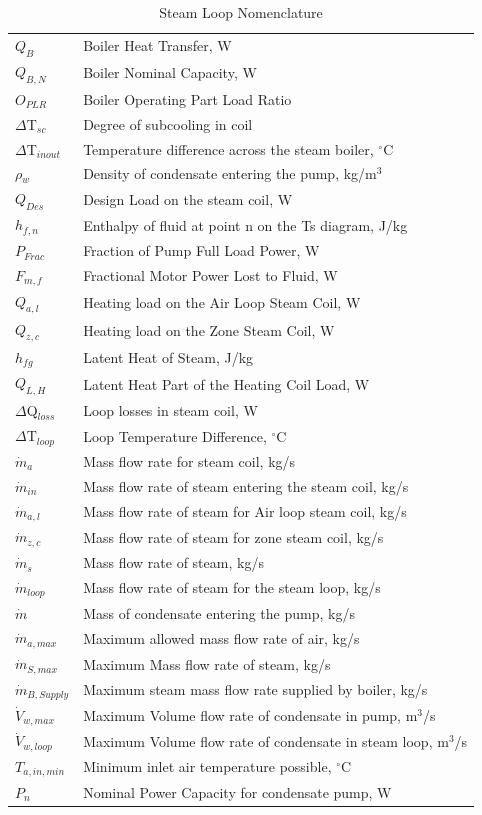 \begin{longtable}[c]{p{1.0in}p{4.0in}}
\caption{Steam Loop Nomenclature \label{table:steam-loop-nomenclature}} \tabularnewline
\toprule 
\endfirsthead

\caption[]{Steam Loop Nomenclature} \tabularnewline
\toprule 
\endhead

\({Q_{B}}\) & Boiler Heat Transfer, W \tabularnewline
\({Q_{B,N}}\) & Boiler Nominal Capacity, W \tabularnewline
\({O_{PLR}}\) & Boiler Operating Part Load Ratio \tabularnewline
\(\Delta\)T\(_{sc}\) & Degree of subcooling in coil \tabularnewline
\(\Delta\)T\(_{inout}\) & Temperature difference across the steam boiler, \(^{\circ}\)C \tabularnewline
\(\rho\)\(_{w}\) & Density of condensate entering the pump, kg/m\(^3\) \tabularnewline
\(Q_{Des}\) & Design Load on the steam coil, W \tabularnewline
\(h_{f,n}\) & Enthalpy of fluid at point n on the Ts diagram, J/kg \tabularnewline
\(P_{Frac}\) & Fraction of Pump Full Load Power, W \tabularnewline
\(F_{m,f}\) & Fractional Motor Power Lost to Fluid, W \tabularnewline
\(Q_{a,l}\) & Heating load on the Air Loop Steam Coil, W \tabularnewline
\(Q_{z,c}\) & Heating load on the Zone Steam Coil, W \tabularnewline
\(h_{fg}\) & Latent Heat of Steam, J/kg \tabularnewline
\(Q_{L,H}\) & Latent Heat Part of the Heating Coil Load, W \tabularnewline
\(\Delta\)Q\(_{loss}\) & Loop losses in steam coil, W \tabularnewline
\(\Delta\)T\(_{loop}\) & Loop Temperature Difference, \(^{\circ}\)C \tabularnewline
\(\dot m_{a}\) & Mass flow rate for steam coil, kg/s \tabularnewline
\(\dot m_{in}\) & Mass flow rate of steam entering the steam coil, kg/s \tabularnewline
\(\dot m_{a,l}\) & Mass flow rate of steam for Air loop steam coil, kg/s \tabularnewline
\(\dot m_{z,c}\) & Mass flow rate of steam for zone steam coil, kg/s \tabularnewline
\(\dot m_{s}\) & Mass flow rate of steam, kg/s \tabularnewline
\(\dot m_{loop}\) & Mass flow rate of steam for the steam loop, kg/s \tabularnewline
\(\dot m\) & Mass of condensate entering the pump, kg/s \tabularnewline
\(\dot m_{a,max}\) & Maximum allowed mass flow rate of air, kg/s \tabularnewline
\(\dot m_{S,max}\) & Maximum Mass flow rate of steam, kg/s \tabularnewline
\(\dot m_{B,Supply}\) & Maximum steam mass flow rate supplied by boiler, kg/s \tabularnewline
\(\dot V_{w,max}\) & Maximum Volume flow rate of condensate in pump, m\(^3\)/s \tabularnewline
\(\dot V_{w,loop}\) & Maximum Volume flow rate of condensate in steam loop, m\(^3\)/s \tabularnewline
\(T_{a,in,min}\) & Minimum inlet air temperature possible, \(^{\circ}\)C \tabularnewline
\(P_{n}\) & Nominal Power Capacity for condensate pump, W \tabularnewline

\end{longtable}
